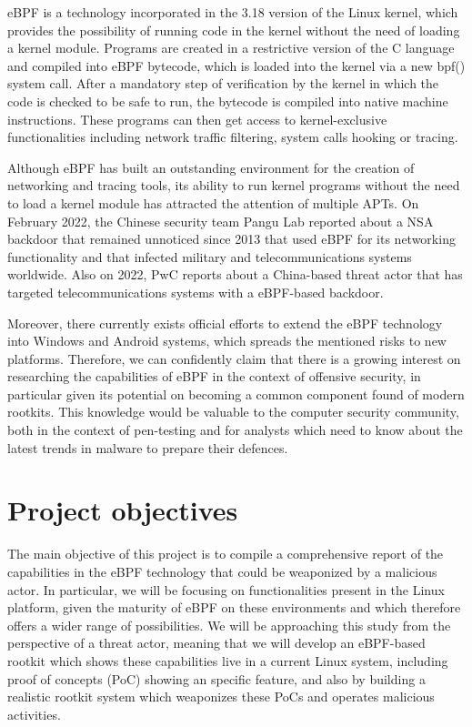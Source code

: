 \documentclass[12pt]{report} %
\begin{document}
eBPF is a technology incorporated in the 3.18 version of the Linux kernel\cite{ebpf_linux318}, which provides the possibility of running code in the kernel without the need of loading a kernel module. Programs are created in a restrictive version of the C language and compiled into eBPF bytecode, which is loaded into the kernel via a new bpf() system call. After a mandatory step of verification by the kernel in which the code is checked to be safe to run, the bytecode is compiled into native machine instructions. These programs can then get access to kernel-exclusive functionalities including network traffic filtering, system calls hooking or tracing.

Although eBPF has built an outstanding environment for the creation of networking and tracing tools, its ability to run kernel programs without the need to load a kernel module has attracted the attention of multiple APTs. On February 2022, the Chinese security team Pangu Lab reported about a NSA backdoor that remained unnoticed since 2013 that used eBPF for its networking functionality and that infected military and telecommunications systems worldwide\cite{bvp47_report}. Also on 2022, PwC reports about a China-based threat actor that has targeted telecommunications systems with a eBPF-based backdoor\cite{bpfdoor_pwc}.

Moreover, there currently exists official efforts to extend the eBPF technology into Windows\cite{ebpf_windows} and Android systems\cite{ebpf_android}, which spreads the mentioned risks to new platforms. Therefore, we can confidently claim that there is a growing interest on researching the capabilities of eBPF in the context of offensive security, in particular given its potential on becoming a common component found of modern rootkits. This knowledge would be valuable to the computer security community, both in the context of pen-testing and for analysts which need to know about the latest trends in malware to prepare their defences.


\section{Project objectives}
The main objective of this project is to compile a comprehensive report of the capabilities in the eBPF technology that could be weaponized by a malicious actor. In particular, we will be focusing on functionalities present in the Linux platform, given the maturity of eBPF on these environments and which therefore offers a wider range of possibilities. We will be approaching this study from the perspective of a threat actor, meaning that we will develop an eBPF-based rootkit which shows these capabilities live in a current Linux system, including proof of concepts (PoC) showing an specific feature, and also by building a realistic rootkit system which weaponizes these PoCs and operates malicious activities. 
\end{document}
